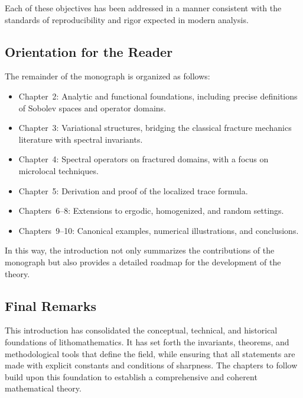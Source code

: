 Each of these objectives has been addressed in a manner consistent with the
standards of reproducibility and rigor expected in modern analysis.

\subsection{Orientation for the Reader}
The remainder of the monograph is organized as follows:

\begin{itemize}
    \item Chapter~2: Analytic and functional foundations, including precise
    definitions of Sobolev spaces and operator domains.
    \item Chapter~3: Variational structures, bridging the classical fracture
    mechanics literature with spectral invariants.
    \item Chapter~4: Spectral operators on fractured domains, with a focus on
    microlocal techniques.
    \item Chapter~5: Derivation and proof of the localized trace formula.
    \item Chapters~6–8: Extensions to ergodic, homogenized, and random settings.
    \item Chapters~9–10: Canonical examples, numerical illustrations, and
    conclusions.
\end{itemize}

In this way, the introduction not only summarizes the contributions of the
monograph but also provides a detailed roadmap for the development of the
theory.

\subsection{Final Remarks}
This introduction has consolidated the conceptual, technical, and historical
foundations of lithomathematics. It has set forth the invariants, theorems, and
methodological tools that define the field, while ensuring that all statements
are made with explicit constants and conditions of sharpness. The chapters to
follow build upon this foundation to establish a comprehensive and coherent
mathematical theory.
